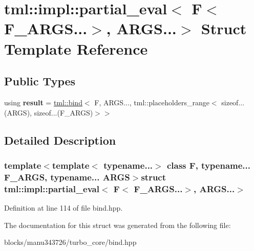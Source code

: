 \hypertarget{structtml_1_1impl_1_1partial__eval_3_01_f_3_01_f___a_r_g_s_8_8_8_4_00_01_a_r_g_s_8_8_8_4}{\section{tml\+:\+:impl\+:\+:partial\+\_\+eval$<$ F$<$ F\+\_\+\+A\+R\+G\+S...$>$, A\+R\+G\+S...$>$ Struct Template Reference}
\label{structtml_1_1impl_1_1partial__eval_3_01_f_3_01_f___a_r_g_s_8_8_8_4_00_01_a_r_g_s_8_8_8_4}
}
\subsection*{Public Types}
\begin{DoxyCompactItemize}
\item 
\hypertarget{structtml_1_1impl_1_1partial__eval_3_01_f_3_01_f___a_r_g_s_8_8_8_4_00_01_a_r_g_s_8_8_8_4_a68d9d7e72cb4003cda25900ba520d10d}{using {\bfseries result} = \hyperlink{structtml_1_1impl_1_1bind}{tml\+::bind}$<$ F, A\+R\+G\+S..., tml\+::placeholders\+\_\+range$<$ sizeof...(A\+R\+G\+S), sizeof...(F\+\_\+\+A\+R\+G\+S)$>$$>$}\label{structtml_1_1impl_1_1partial__eval_3_01_f_3_01_f___a_r_g_s_8_8_8_4_00_01_a_r_g_s_8_8_8_4_a68d9d7e72cb4003cda25900ba520d10d}

\end{DoxyCompactItemize}


\subsection{Detailed Description}
\subsubsection*{template$<$template$<$ typename...$>$ class F, typename... F\+\_\+\+A\+R\+G\+S, typename... A\+R\+G\+S$>$struct tml\+::impl\+::partial\+\_\+eval$<$ F$<$ F\+\_\+\+A\+R\+G\+S...$>$, A\+R\+G\+S...$>$}



Definition at line 114 of file bind.\+hpp.



The documentation for this struct was generated from the following file\+:\begin{DoxyCompactItemize}
\item 
blocks/manu343726/turbo\+\_\+core/bind.\+hpp\end{DoxyCompactItemize}
